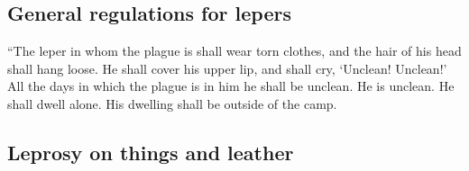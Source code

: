 \begin{paracol}{2}
\begin{otherlanguage}{english}
\hypertarget{general-regulations-for-lepers}{%
\subsection{General regulations for
lepers}\label{general-regulations-for-lepers}}

 ``The leper in whom the plague is shall wear torn
clothes, and the hair of his head shall hang loose. He shall cover his
upper lip, and shall cry, `Unclean! Unclean!'  All the
days in which the plague is in him he shall be unclean. He is unclean.
He shall dwell alone. His dwelling shall be outside of the camp.

\hypertarget{leprosy-on-things-and-leather}{%
\subsection{Leprosy on things and
leather}\label{leprosy-on-things-and-leather}}


\end{otherlanguage}
\end{paracol}
